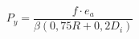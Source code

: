 \documentclass[12pt]{article}
\begin{document}
\begin{displaymath}
P_y = \frac { f \cdot e_a } { \beta \left( 0,75 R + 0,2 D_i \right) }
\end{displaymath}
\end{document}
